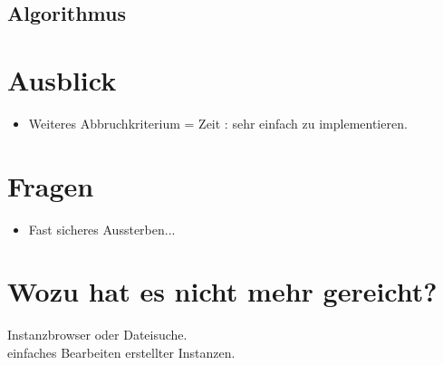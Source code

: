 \documentclass[11pt, a4paper, german]{article}
\theoremstyle{plain}
\begin{document}
	\subsection{Algorithmus}
\clearpage
\section{Ausblick}

\begin{itemize}
	\item Weiteres Abbruchkriterium = Zeit : sehr einfach zu implementieren.
\end{itemize}

\clearpage


\clearpage

\section{Fragen}
\begin{itemize}
	\item Fast sicheres Aussterben...
\end{itemize}

\section{Wozu hat es nicht mehr gereicht?}
Instanzbrowser oder Dateisuche.\\
einfaches Bearbeiten erstellter Instanzen.\\
\end{document}
